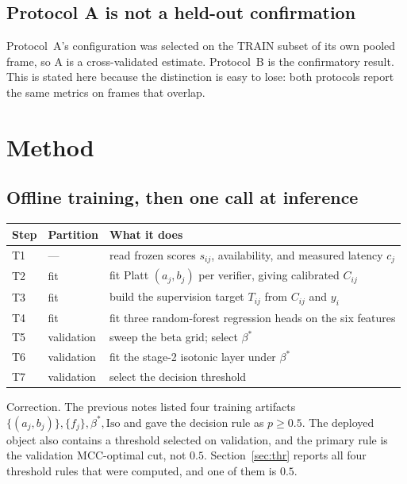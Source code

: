 \documentclass[10pt,a4paper]{article}
\newcommand{\fix}[1]{\textcolor{red!65!black}{#1}}
\begin{document}
\subsection{Protocol A is not a held-out confirmation}

Protocol~A's configuration was selected on the TRAIN subset of its own pooled frame, so A is a
cross-validated estimate. Protocol~B is the confirmatory result. This is stated here because the
distinction is easy to lose: both protocols report the same metrics on frames that overlap.

\section{Method}

\subsection{Offline training, then one call at inference}

\begin{center}\small
\begin{tabular}{llp{7.6cm}}
\toprule
Step & Partition & What it does \\
\midrule
T1 & --- & read frozen scores $s_{ij}$, availability, and measured latency $c_j$ \\
T2 & fit & fit Platt $(a_j,b_j)$ per verifier, giving calibrated $C_{ij}$ \\
T3 & fit & build the supervision target $T_{ij}$ from $C_{ij}$ and $y_i$ \\
T4 & fit & fit three random-forest regression heads on the six features \\
T5 & validation & sweep the beta grid; select $\beta^{*}$ \\
T6 & validation & fit the stage-2 isotonic layer under $\beta^{*}$ \\
\fix{T7} & \fix{validation} & \fix{select the decision threshold} \\
\bottomrule
\end{tabular}
\end{center}

\fix{Correction.} The previous notes listed four training artifacts
$\{(a_j,b_j)\},\{f_j\},\beta^{*},\mathrm{Iso}$ and gave the decision rule as $p\ge0.5$. The
deployed object also contains a threshold selected on validation, and the primary rule is the
validation MCC-optimal cut, not $0.5$. Section~\ref{sec:thr} reports all four threshold rules
that were computed, and one of them is $0.5$.
\end{document}
